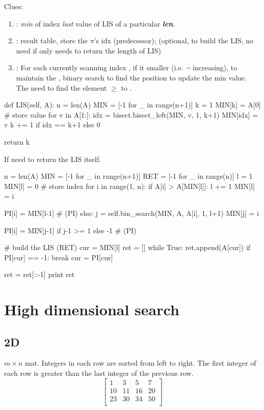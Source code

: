 Clues:
\begin{enumerate}
\item {}: \textit{min} of index \textit{last} value of LIS of a particular \textit{\textbf{len}}.
\item {}: result table, store the $\pi$'s idx (predecessor); (optional, to build the LIS, no need if only needs to return the length of LIS)
\item {}: For each currently scanning index , if it smaller (i.e. $\neg$ increasing), to maintain the , binary search to find the position to update the min value. The  need to find the element $\geq$ to .
\end{enumerate}
\newpage
\begin{python}
def LIS(self, A):
    n = len(A)
    MIN = [-1 for _ in range(n+1)]
    k = 1
    MIN[k] = A[0]  # store value
    for v in A[1:]:
        idx = bisect.bisect_left(MIN, v, 1, k+1)
        MIN[idx] = v
        k += 1 if idx == k+1 else 0

    return k
\end{python}
If need to return the LIS itself. 
\begin{python}
    n = len(A)
    MIN = [-1 for _ in range(n+1)]
    RET = [-1 for _ in range(n)]
    l = 1
    MIN[l] = 0  # store index
    for i in range(1, n):
        if A[i] > A[MIN[l]]:
            l += 1
            MIN[l] = i

            PI[i] = MIN[l-1]  # (PI)
        else:
            j = self.bin_search(MIN, A, A[i], 1, l+1)
            MIN[j] = i

            PI[i] = MIN[j-1] if j-1 >= 1 else -1  # (PI)

    # build the LIS (RET)
    cur = MIN[l]
    ret = []
    while True:
        ret.append(A[cur])
        if PI[cur] == -1: break
        cur = PI[cur]

    ret = ret[::-1]
    print ret
\end{python}

\section{High dimensional search}
\subsection{2D}
 $m\times n$ mat. Integers in each row are sorted from left to right. The first integer of each row is greater than the last integer of the previous row.
$$
\begin{bmatrix}
1 & 3 & 5 & 7 \\
10 & 11 & 16 & 20 \\
23 & 30 & 34 & 50 \\
\end{bmatrix}
$$


